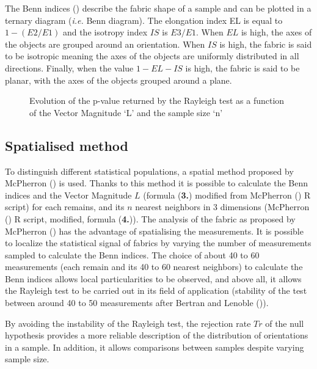 \documentclass[
]{article}
\makeatletter
\newcommand*\pandocbounded[1]{%
  \sbox\pandoc@box{#1}%
  \Gscale@div\@tempa{\textheight}{\dimexpr\ht\pandoc@box+\dp\pandoc@box\relax}%
  \Gscale@div\@tempb{\linewidth}{\wd\pandoc@box}%
  \ifdim\@tempb\p@<\@tempa\p@\let\@tempa\@tempb\fi%
  \ifdim\@tempa\p@<\p@\scalebox{\@tempa}{\usebox\pandoc@box}%
  \else\usebox{\pandoc@box}%
  \fi%
}
\makeatother
\begin{document}
The Benn indices () describe the
fabric shape of a sample and can be plotted in a ternary diagram
(\emph{i.e.} Benn diagram). The elongation index EL is equal to
\(1-(E2/E1)\) and the isotropy index \(IS\) is \(E3/E1\). When \(EL\) is
high, the axes of the objects are grouped around an orientation. When
\(IS\) is high, the fabric is said to be isotropic meaning the axes of
the objects are uniformly distributed in all directions. Finally, when
the value \(1-EL-IS\) is high, the fabric is said to be planar, with the
axes of the objects grouped around a plane. \bigskip

\begin{figure}
\centering
\pandocbounded{\texttt{[image: article\_files/figure-latex/rayleigh-1.pdf]}}
\caption{Evolution of the p-value returned by the Rayleigh test as a
function of the Vector Magnitude `L' and the sample size `n'
\label{rayleigh}}
\end{figure}

\subsection{Spatialised method}\label{spatialised-method}

To distinguish different statistical populations, a spatial method
proposed by McPherron () is used.
Thanks to this method it is possible to calculate the Benn indices and
the Vector Magnitude \(L\) (formula (\textbf{3.}) modified from
McPherron () R script) for each
remains, and its \(n\) nearest neighbors in 3 dimensions (McPherron
() R script, modified, formula
(\textbf{4.})). The analysis of the fabric as proposed by McPherron
() has the advantage of spatialising
the measurements. It is possible to localize the statistical signal of
fabrics by varying the number of measurements sampled to calculate the
Benn indices. The choice of about 40 to 60 measurements (each remain and
its 40 to 60 nearest neighbors) to calculate the Benn indices allows
local particularities to be observed, and above all, it allows the
Rayleigh test to be carried out in its field of application (stability
of the test between around 40 to 50 measurements after Bertran and
Lenoble ()).

By avoiding the instability of the Rayleigh test, the rejection rate
\(Tr\) of the null hypothesis provides a more reliable description of
the distribution of orientations in a sample. In addition, it allows
comparisons between samples despite varying sample size.
\end{document}
